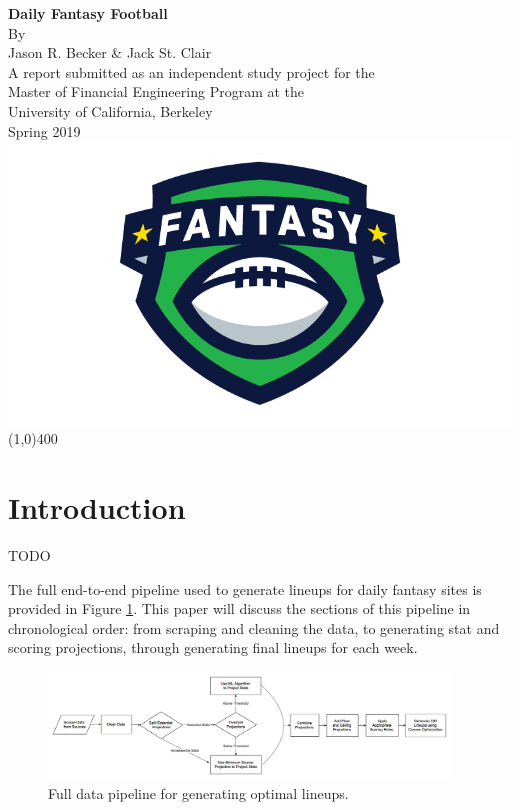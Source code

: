 \documentclass[12pt]{article}
\begin{document}
\begin{titlepage}
	\begin{center}
	\vspace*{4cm}
	\huge{\textbf{Daily Fantasy Football}}\\[2cm]
	\Large{By\\[2mm] Jason R. Becker \& Jack St. Clair}\\[2cm]
	\large{A report submitted as an independent study project for the\\
		Master of Financial Engineering Program at the\\
		 University of California, Berkeley}\\[1cm]	
	\Large{Spring 2019}\\[2cm]
	\includegraphics[scale=0.3]{../figures/fantasy_logo}
	\vfill
	\line(1,0){400}
	\end{center}
\end{titlepage}


\section{Introduction}
TODO\bigskip


The full end-to-end pipeline used to generate lineups for daily fantasy sites is provided in Figure \ref{pipeline}. This paper will discuss the sections of this pipeline in chronological order: from scraping and cleaning the data, to generating stat and scoring projections, through generating final lineups for each week.

\begin{figure}[H]
  \centering
  \includegraphics[width=0.95\textwidth]{../figures/pipeline}
  \caption{Full data pipeline for generating optimal lineups.}
  \label{pipeline}
\end{figure}
\end{document}
